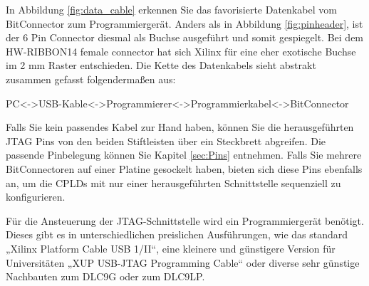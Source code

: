 \documentclass{article}
\begin{document}
In Abbildung \ref{fig:data_cable} erkennen Sie das favorisierte Datenkabel vom BitConnector zum Programmiergerät. Anders als in Abbildung \ref{fig:pinheader}, ist der 6 Pin Connector diesmal als Buchse ausgeführt und somit gespiegelt. Bei dem HW-RIBBON14 female connector hat sich Xilinx für eine eher exotische Buchse im 2 mm Raster entschieden. Die Kette des Datenkabels sieht abstrakt zusammen gefasst folgendermaßen aus:
\vspace{0.5cm}
\begin{center}
	PC<->USB-Kable<->Programmierer<->Programmierkabel<->BitConnector
\end{center}

\vspace{0.5cm}

Falls Sie kein passendes Kabel zur Hand haben, können Sie die herausgeführten JTAG Pins von den beiden Stiftleisten über ein Steckbrett abgreifen. Die passende Pinbelegung können Sie Kapitel \ref{sec:Pins} entnehmen.
Falls Sie mehrere BitConnectoren auf einer Platine gesockelt haben, bieten sich diese Pins ebenfalls an, um die CPLDs mit nur einer herausgeführten Schnittstelle sequenziell zu konfigurieren.


Für die Ansteuerung der JTAG-Schnittstelle wird ein Programmiergerät benötigt. Dieses gibt es in unterschiedlichen preislichen Ausführungen, wie das standard „Xilinx Platform Cable USB 1/II“, eine kleinere und günstigere Version für Universitäten „XUP USB-JTAG Programming Cable“ oder diverse sehr günstige Nachbauten zum DLC9G oder zum DLC9LP. 





\newpage
\printbibliography
\end{document}
